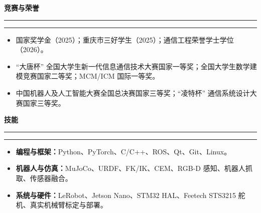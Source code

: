 \documentclass[UTF8,a4paper,10pt,scheme=plain]{ctexart}
\newcommand{\cvsection}[1]{%
  \vspace{8pt}
  {\large\bfseries\color{Ink}#1}\par
  \vspace{2pt}
  {\color{Accent}\rule{0.72cm}{1.25pt}}{\color{Rule}\rule{\dimexpr\linewidth-0.72cm\relax}{0.45pt}}\par
  \vspace{3pt}
}
\begin{document}
\cvsection{竞赛与荣誉}
\begin{itemize}
  \item 国家奖学金（2025）；重庆市三好学生（2025）；通信工程荣誉学士学位（2026）。
  \item ``大唐杯'' 全国大学生新一代信息通信技术大赛国家一等奖；全国大学生数学建模竞赛国家二等奖；MCM/ICM 国际一等奖。
  \item 中国机器人及人工智能大赛全国总决赛国家三等奖；``凌特杯'' 通信系统设计大赛国家三等奖。
\end{itemize}

\cvsection{技能}
\begin{itemize}
  \item \textbf{编程与框架：}Python、PyTorch、C/C++、ROS、Qt、Git、Linux。
  \item \textbf{机器人与仿真：}MuJoCo、URDF、FK/IK、CEM、RGB-D 感知、机器人抓取、传感器融合。
  \item \textbf{系统与硬件：}LeRobot、Jetson Nano、STM32 HAL、Feetech STS3215 舵机、真实机械臂标定与部署。
\end{itemize}
\end{document}
